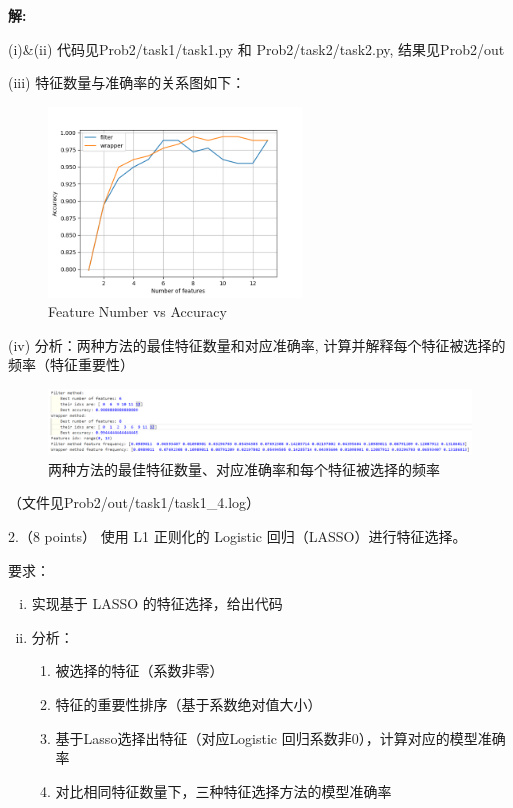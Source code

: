 \documentclass[8pt]{article}
\begin{document}
\textbf{\large 解:}

(i)\&(ii) {\color{red}代码见Prob2/task1/task1.py 和 Prob2/task2/task2.py, 结果见Prob2/out}

(iii) 特征数量与准确率的关系图如下：
\begin{figure}[H]
    \centering
    \includegraphics[width=0.6\textwidth]{Prob2/out/task1/feature_number_vs_accuracy.png}
    \caption{Feature Number vs Accuracy}
    \label{fig:Wine Feature Number vs Accuracy}
\end{figure}

(iv) 分析：两种方法的最佳特征数量和对应准确率, 计算并解释每个特征被选择的频率（特征重要性）

\begin{figure}[H]
    \centering
    \includegraphics[width=\textwidth]{Prob2/out/task1/task1_4.png}
    \caption{两种方法的最佳特征数量、对应准确率和每个特征被选择的频率}
    \label{fig:Two Feature Selection Methods Comparison}
\end{figure}

（文件见{\color{blue}Prob2/out/task1/task1\_4.log}）

\vspace{1em}

2.（8 points） 使用 L1 正则化的 Logistic 回归（LASSO）进行特征选择。

要求：
\begin{enumerate}[(i)]
    \item 实现基于 LASSO 的特征选择，给出代码
    \item 分析：
    \begin{enumerate}
        \item 被选择的特征（系数非零）
        \item 特征的重要性排序（基于系数绝对值大小）
        \item 基于Lasso选择出特征（对应Logistic 回归系数非0），计算对应的模型准确率
        \item 对比相同特征数量下，三种特征选择方法的模型准确率
    \end{enumerate}
\end{enumerate}
\end{document}
